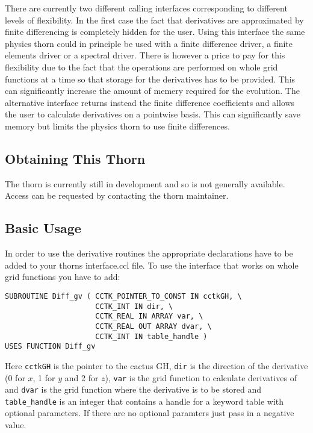 There are currently two different calling interfaces corresponding to different
levels of flexibility. In the first case the fact that derivatives are
approximated by finite differencing is completely hidden for the user. Using
this interface the same physics thorn could in principle be used with a
finite difference driver, a finite elements driver or a spectral driver. There
is however a price to pay for this flexibility due to the fact that the
operations are performed on whole grid functions at a time so that storage
for the derivatives has to be provided. This can significantly increase the
amount of memery required for the evolution. The alternative interface
returns instead the finite difference coefficients and allows the user to
calculate derivatives on a pointwise basis. This can significantly save
memory but limits the physics thorn to use finite differences.
\subsection{Obtaining This Thorn}
The thorn is currently still in development and so is not generally available.
Access can be requested by contacting the thorn maintainer.
\subsection{Basic Usage}
In order to use the derivative routines the appropriate declarations have 
to be added to your thorns interface.ccl file. To use the interface that
works on whole grid functions you have to add:
\begin{verbatim}
SUBROUTINE Diff_gv ( CCTK_POINTER_TO_CONST IN cctkGH, \
                     CCTK_INT IN dir, \
                     CCTK_REAL IN ARRAY var, \
                     CCTK_REAL OUT ARRAY dvar, \
                     CCTK_INT IN table_handle )
USES FUNCTION Diff_gv
\end{verbatim}
Here {\tt cctkGH} is the pointer to the cactus GH, {\tt dir} is the direction
of the derivative (0 for $x$, 1 for $y$ and 2 for $z$), {\tt var} is the grid
function to calculate derivatives of and {\tt dvar} is the grid function where
the derivative is to be stored and {\tt table\_handle} is an integer that
contains a handle for a keyword table with optional parameters. If there are
no optional paramters just pass in a negative value.

